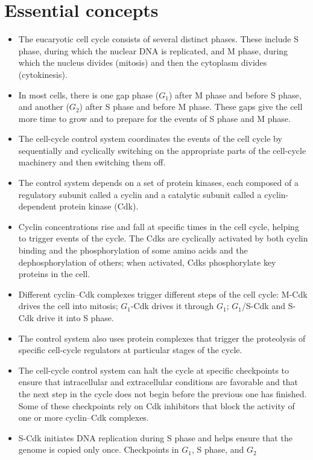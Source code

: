 \section{Essential concepts}

\begin{itemize}
\item The eucaryotic cell cycle consists of several distinct phases. These
include S phase, during which the nuclear DNA is replicated, and M
phase, during which the nucleus divides (mitosis) and then the cytoplasm
divides (cytokinesis).
\item In most cells, there is one gap phase ($G_1$) after M phase and before
S phase, and another ($G_2$) after S phase and before M phase. These
gaps give the cell more time to grow and to prepare for the events of
S phase and M phase.
\item The cell-cycle control system coordinates the events of the cell cycle
by sequentially and cyclically switching on the appropriate parts of
the cell-cycle machinery and then switching them off.
\item The control system depends on a set of protein kinases, each composed
of a regulatory subunit called a cyclin and a catalytic subunit
called a cyclin-dependent protein kinase (Cdk).
\item Cyclin concentrations rise and fall at specific times in the cell cycle,
helping to trigger events of the cycle. The Cdks are cyclically activated
by both cyclin binding and the phosphorylation of some amino
acids and the dephosphorylation of others; when activated, Cdks
phosphorylate key proteins in the cell.
\item Different cyclin–Cdk complexes trigger different steps of the cell
cycle: M-Cdk drives the cell into mitosis; $G_1$-Cdk drives it through $G_1$;
$G_1$/S-Cdk and S-Cdk drive it into S phase.
\item The control system also uses protein complexes that trigger the proteolysis
of specific cell-cycle regulators at particular stages of the
cycle.
\item The cell-cycle control system can halt the cycle at specific checkpoints
to ensure that intracellular and extracellular conditions are favorable
and that the next step in the cycle does not begin before the previous
one has finished. Some of these checkpoints rely on Cdk inhibitors
that block the activity of one or more cyclin–Cdk complexes.
\item S-Cdk initiates DNA replication during S phase and helps ensure that
the genome is copied only once. Checkpoints in $G_1$, S phase, and $G_2$

\end{itemize}
